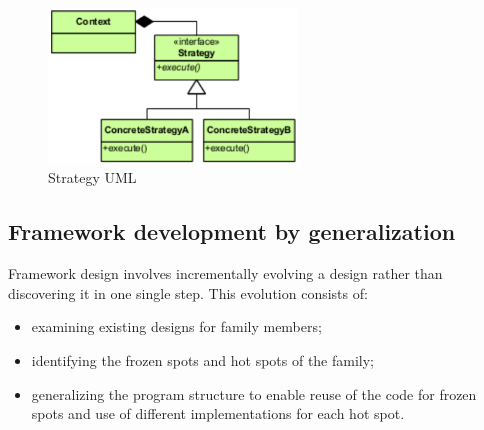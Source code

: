 \begin{figure}[H]
    \centering
    \includegraphics[width=250px]{images/9_Frameworks/strategy_UML.png}
    \caption{Strategy UML}
\end{figure}

\subsection{Framework development by generalization}
Framework design involves incrementally evolving a design rather than discovering it in one single step.
This evolution consists of:
\begin{itemize}
    \item examining existing designs for family members;
    \item identifying the frozen spots and hot spots of the family;
    \item generalizing the program structure to enable reuse of the code for frozen spots and use of different implementations for each hot spot.
\end{itemize}







